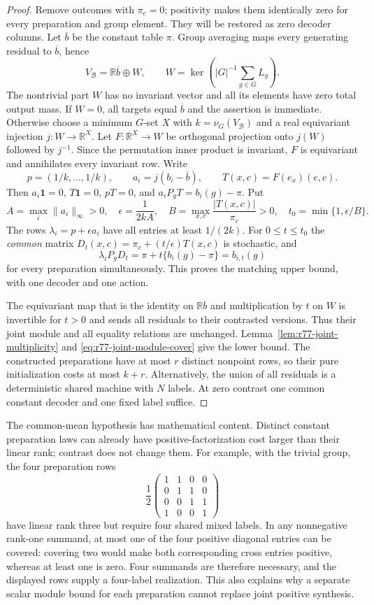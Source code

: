 \begin{proof}
Remove outcomes with $\pi_c=0$; positivity makes them identically zero
for every preparation and group element.  They will be restored as
zero decoder columns.  Let $\overline b$ be the constant table $\pi$.
Group averaging maps every generating residual to $\overline b$, hence
\[
 V_{\mathcal B}=\mathbb R\overline b\oplus W,
 \qquad W=\ker\left(|G|^{-1}\sum_{g\in G}L_g\right).
\]
The nontrivial part $W$ has no invariant vector and all its elements have
zero total output mass.  If $W=0$, all targets equal $\overline b$ and
the assertion is immediate.  Otherwise choose a minimum $G$-set $X$
with $k=\nu_G(V_{\mathcal B})$ and a real equivariant injection
$j:W\to\mathbb R^X$.  Let $F:\mathbb R^X\to W$ be orthogonal
projection onto $j(W)$ followed by $j^{-1}$.  Since the permutation
inner product is invariant, $F$ is equivariant and annihilates every
invariant row.  Write
\[
 p=(1/k,\ldots,1/k),\qquad
 a_i=j(b_i-\overline b),\qquad
 T(x,c)=F(e_x)(e,c).
\]
Then $a_i\mathbf1=0$, $T\mathbf1=0$, $pT=0$, and
$a_iP_gT=b_i(g)-\pi$.  Put
\[
 A=\max_i\|a_i\|_\infty>0,\quad
 \epsilon=\frac1{2kA},\quad
 B=\max_{x,c}\frac{|T(x,c)|}{\pi_c}>0,\quad
 t_0=\min\{1,\epsilon/B\}.
\]
The rows $\lambda_i=p+\epsilon a_i$ have all entries at least
$1/(2k)$.  For $0\le t\le t_0$ the \emph{common} matrix
$D_t(x,c)=\pi_c+(t/\epsilon)T(x,c)$ is stochastic, and
\[
 \lambda_iP_gD_t=\pi+t\{b_i(g)-\pi\}=b_{i,t}(g)
\]
for every preparation simultaneously.  This proves the matching upper
bound, with one decoder and one action.

The equivariant map that is the identity on $\mathbb R\overline b$
and multiplication by $t$ on $W$ is invertible for $t>0$ and sends all
residuals to their contrasted versions.  Thus their joint module and
all equality relations are unchanged.  Lemma~\ref{lem:r77-joint-multiplicity}
and \eqref{eq:r77-joint-module-cover} give the lower bound.  The constructed
preparations have at most $r$ distinct nonpoint rows, so their pure
initialization costs at most $k+r$.  Alternatively, the union of all
residuals is a deterministic shared machine with $N$ labels.  At zero
contrast one common constant decoder and one fixed label suffice.
\end{proof}

The common-mean hypothesis has mathematical content.  Distinct constant
preparation laws can already have positive-factorization cost larger
than their linear rank; contrast does not change them.  For example,
with the trivial group, the four preparation rows
\[
 \frac12\begin{pmatrix}
 1&1&0&0\\0&1&1&0\\0&0&1&1\\1&0&0&1
 \end{pmatrix}
\]
have linear rank three but require four shared mixed labels.  In any
nonnegative rank-one summand, at most one of the four positive diagonal
entries can be covered: covering two would make both corresponding
cross entries positive, whereas at least one is zero.  Four summands
are therefore necessary, and the displayed rows supply a four-label
realization.  This also explains why a separate scalar module bound
for each preparation cannot replace joint positive synthesis.

